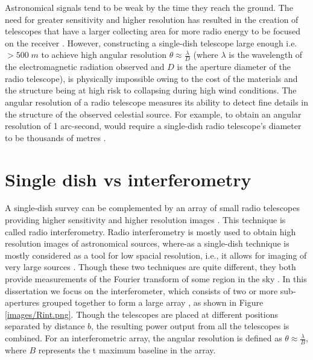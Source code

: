 Astronomical signals tend to be weak by the time they reach the ground. The need for greater sensitivity and higher resolution has resulted in the creation of telescopes that have a larger collecting area for more radio energy to be focused on the receiver \citep{verschuur2015invisible}. However, constructing a single-dish telescope large enough i.e. $>500\;m$ to achieve high angular resolution $\theta \approx\frac{\lambda}{D}$ (where $\lambda$ is the wavelength of the electromagnetic radiation observed and $D$ is the aperture diameter of the radio telescope), is physically impossible owing to the cost of the materials and the structure being at high risk to collapsing during high wind conditions. The angular resolution of a radio telescope measures its ability to detect fine details in the structure of the observed celestial source. For example, to obtain an angular resolution of 1 arc-second, would require a single-dish radio telescope's diameter to be thousands of metres \citep{verschuur2015invisible}. 

\section{Single dish vs interferometry}
\label{RvI}


A single-dish survey can be complemented by an array of small radio telescopes providing higher sensitivity and higher resolution images  \citep{wright2004single}. This technique is called radio interferometry. Radio interferometry is mostly used to obtain high resolution images of astronomical sources, where-as a single-dish technique is mostly considered as a tool for low spacial resolution, i.e., it allows for imaging of very large sources \citep{stanimirovic2002short}. Though these two techniques are quite different, they both provide measurements of the Fourier transform of  some region in the sky \citep{cornwell1988radio}. In this dissertation we focus on the interferometer, which consists of two or more sub-apertures grouped together to form a large array \citep{verschuur2015invisible}, as shown in Figure \ref{images/Rint.png}. Though the telescopes are placed at different positions separated by distance $b$, the resulting power output from all the telescopes is combined. For an interferometric array, the angular resolution is defined as  $\theta \approx\frac{\lambda}{B}$, where $B$ represents the t maximum baseline in the array. 

